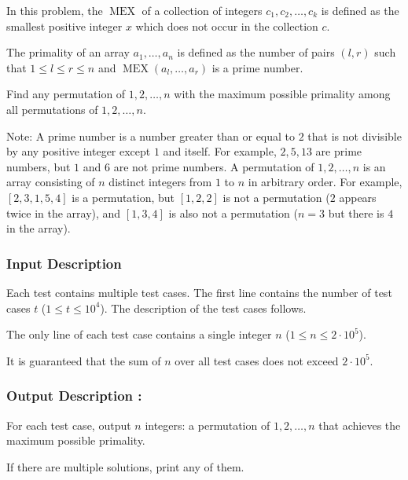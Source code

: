 \documentclass{article}
\begin{document}
In this problem, the $\operatorname{MEX}$ of a collection of integers $c_1,c_2,\dots,c_k$ is defined as the smallest positive integer $x$ which does not occur in the collection $c$. 

The primality of an array $a_1,\dots,a_n$ is defined as the number of pairs $(l,r)$ such that $1 \le l \le r \le n$ and $\operatorname{MEX}(a_l,\dots,a_r)$ is a prime number. 

Find any permutation of $1,2,\dots,n$ with the maximum possible primality among all permutations of $1,2,\dots,n$. 

Note:   A prime number is a number greater than or equal to $2$ that is not divisible by any positive integer except $1$ and itself. For example, $2,5,13$ are prime numbers, but $1$ and $6$ are not prime numbers.  A permutation of $1,2,\dots,n$ is an array consisting of $n$ distinct integers from $1$ to $n$ in arbitrary order. For example, $[2,3,1,5,4]$ is a permutation, but $[1,2,2]$ is not a permutation ($2$ appears twice in the array), and $[1,3,4]$ is also not a permutation ($n=3$ but there is $4$ in the array).
\paragraph{}
\subsubsection*{Input Description}Each test contains multiple test cases. The first line contains the number of test cases $t$ ($1 \le t \le 10^4$). The description of the test cases follows.

The only line of each test case contains a single integer $n$ ($1 \le n \le 2 \cdot 10^5$).

It is guaranteed that the sum of $n$ over all test cases does not exceed $2 \cdot 10^5$.
\paragraph{}
\subsubsection*{Output Description : }For each test case, output $n$ integers: a permutation of $1,2,\dots,n$ that achieves the maximum possible primality.

If there are multiple solutions, print any of them.
\end{document}
